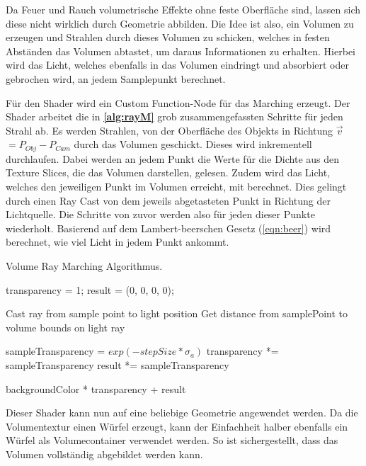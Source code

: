 Da Feuer und Rauch volumetrische Effekte ohne feste Oberfläche sind, lassen sich diese nicht wirklich durch Geometrie abbilden. Die Idee ist also, ein
Volumen zu erzeugen und Strahlen durch dieses Volumen zu schicken, welches in festen Abständen das Volumen abtastet, um daraus Informationen zu erhalten.
Hierbei wird das Licht, welches ebenfalls in das Volumen eindringt und absorbiert oder gebrochen wird, an jedem Samplepunkt berechnet.

Für den Shader wird ein Custom Function-Node für das Marching erzeugt. Der Shader arbeitet die in \textbf{\autoref{alg:rayM}} grob zusammengefassten
Schritte für jeden Strahl ab.
Es werden Strahlen, von der Oberfläche des Objekts in Richtung $\vec{v}$ $= P_{Obj} - P_{Cam}$ durch das Volumen geschickt.
Dieses wird inkrementell durchlaufen. Dabei werden an jedem Punkt die Werte für die Dichte aus den Texture Slices, die das Volumen darstellen, gelesen. 
Zudem wird das Licht, welches den jeweiligen Punkt im Volumen erreicht, mit berechnet. Dies gelingt durch einen Ray Cast von
dem jeweils abgetasteten Punkt in Richtung der Lichtquelle. Die Schritte von zuvor werden also für jeden dieser Punkte wiederholt.
Basierend auf dem Lambert-beerschen Gesetz (\autoref{eqn:beer}) wird berechnet, wie viel Licht in jedem Punkt ankommt.



\begin{algorithm}
	\caption{Volume Ray Marching Algorithmus.}\label{alg:rayM}
	\begin{algorithmic}[1]
		\State transparency = 1;
		\State result = (0, 0, 0, 0);
		
		
		\State Cast ray from sample point to light position
		\State Get distance from samplePoint to volume bounds on light ray

		\State sampleTransparency = $exp(-stepSize * \sigma_a)$
		\State transparency *= sampleTransparency
		\State result *= sampleTransparency
		\EndFor
		
		\Return backgroundColor * transparency + result
	\end{algorithmic}
\end{algorithm}

Dieser Shader kann nun auf eine beliebige Geometrie angewendet werden. 
Da die Volumentextur einen Würfel erzeugt, kann der Einfachheit halber ebenfalls ein Würfel als Volumecontainer verwendet werden.
So ist sichergestellt, dass das Volumen vollständig abgebildet werden kann.


